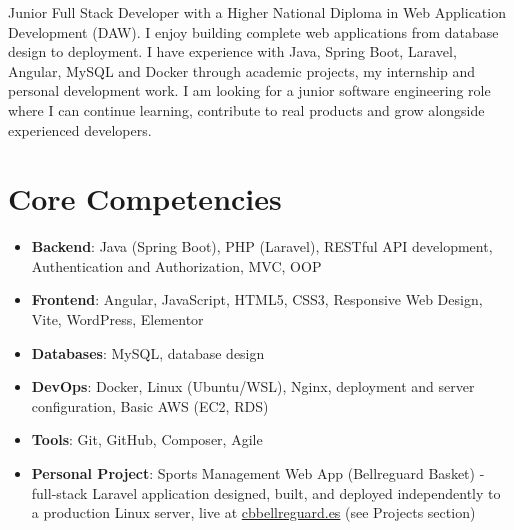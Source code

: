 \documentclass[11pt,a4paper,sans]{moderncv}
\begin{document}
\makecvtitle


\vspace{6pt}
\small{Junior Full Stack Developer with a Higher National Diploma in Web Application Development (DAW). I enjoy building complete web applications from database design to deployment. I have experience with Java, Spring Boot, Laravel, Angular, MySQL and Docker through academic projects, my internship and personal development work. I am looking for a junior software engineering role where I can continue learning, contribute to real products and grow alongside experienced developers.}


\section{Core Competencies}
\vspace{1pt}
\begin{itemize}

\item \textbf{Backend}: Java (Spring Boot), PHP (Laravel), RESTful API development, Authentication and Authorization, MVC, OOP

\item \textbf{Frontend}: Angular, JavaScript, HTML5, CSS3, Responsive Web Design, Vite, WordPress, Elementor

\item \textbf{Databases}: MySQL, database design

\item \textbf{DevOps}: Docker, Linux (Ubuntu/WSL), Nginx, deployment and server configuration, Basic AWS (EC2, RDS)

\item \textbf{Tools}: Git, GitHub, Composer, Agile

\item \textbf{Personal Project}: Sports Management Web App (Bellreguard Basket) - full-stack Laravel application designed, built, and deployed independently to a production Linux server, live at \href{https://cbbellreguard.es}{cbbellreguard.es} (see Projects section)

\end{itemize}
\end{document}
